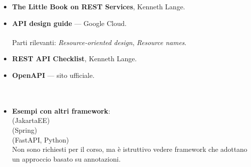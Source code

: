 \begin{itemize}
  \item \textbf{The Little Book on REST Services}, Kenneth Lange. \\
  \item \textbf{API design guide} --- Google Cloud. \\
         \\
        Parti rilevanti: \textit{Resource-oriented design}, \textit{Resource
        names}.
  \item \textbf{REST API Checklist}, Kenneth Lange. \\
  \item \textbf{OpenAPI} --- sito ufficiale. \\
         \\
         \\
  \item \textbf{Esempi con altri framework}: \\
         (JakartaEE) \\
         (Spring) \\
         (FastAPI, Python) \\
        Non sono richiesti per il corso, ma è istruttivo vedere framework che
        adottano un approccio basato su annotazioni.
\end{itemize}
